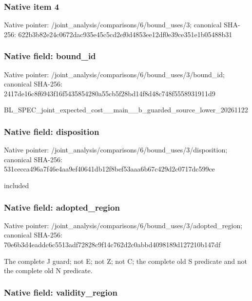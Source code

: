 \documentclass[10pt,a4paper]{article}
\begin{document}
\subsubsection{Native item 4}


Native pointer: /joint\_analysis/comparis\allowbreak{}ons/6/bound\_uses/3; canonical SHA-256: 622b3b82e24c0672dac935e4\allowbreak{}5c5cd2ef0d4853ee12df0e39\allowbreak{}ce351e1b05488b31



\subsubsection{Native field: bound\_id}


Native pointer: /joint\_analysis/comparis\allowbreak{}ons/6/bound\_uses/3/bound\allowbreak{}\_id; canonical SHA-256: 2417de16c8f6943f16f54358\allowbreak{}54280a55cb5f28bd14f8d48c\allowbreak{}748f5558931911d9


BL\_SPEC\_joint\_expected\_c\allowbreak{}ost\_\_main\_\_b\_guarded\_sou\allowbreak{}rce\_lower\_20261122


\subsubsection{Native field: disposition}


Native pointer: /joint\_analysis/comparis\allowbreak{}ons/6/bound\_uses/3/dispo\allowbreak{}sition; canonical SHA-256: 531cecca496a7f46e4aa9ef4\allowbreak{}0641db12f8bef53aaa6b67c4\allowbreak{}29d2c0717dc599ce


included


\subsubsection{Native field: adopted\_region}


Native pointer: /joint\_analysis/comparis\allowbreak{}ons/6/bound\_uses/3/adopt\allowbreak{}ed\_region; canonical SHA-256: 70e6b3d4eaddc6c5513adf72\allowbreak{}828c9f14c762d2c0abbd4098\allowbreak{}189d127210b147df


The complete J guard; not E; not Z; not C; the complete old S predicate and not the complete old N predicate.


\subsubsection{Native field: validity\_region}
\end{document}
